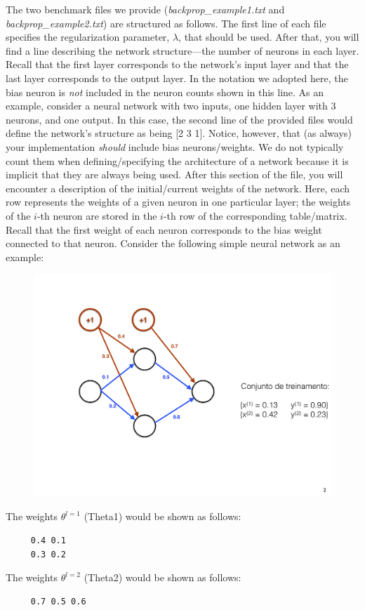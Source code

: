 \documentclass[letterpaper]{article}
\begin{document}
The two benchmark files we provide (\emph{backprop\_example1.txt} and \emph{backprop\_example2.txt}) are structured as follows. The first line of each file specifies the regularization parameter, $\lambda$, that should be used. After that, you will find a line describing the network structure---the number of neurons in each layer. Recall that the first layer corresponds to the network's input layer and that the last layer corresponds to the output layer. In the notation we adopted here, the bias neuron is \textit{not} included in the neuron counts shown in this line. As an example, consider a neural network with two inputs, one hidden layer with 3 neurons, and one output. In this case, the second line of the provided files would define the network's structure as being [2 3 1]. Notice, however, that (as always) your implementation \textit{should} include bias neurons/weights. We do not typically count them when defining/specifying the architecture of a network because it is implicit that they are always being used. After this section of the file, you will encounter a description of the initial/current weights of the network. Here, each row represents the weights of a given neuron in one particular layer; the weights of the $i$-th neuron are stored in the $i$-th row of the corresponding table/matrix. Recall that the first weight of each neuron corresponds to the bias weight connected to that neuron. Consider the following simple neural network as an example:

    \begin{figure}[!h]
        \centering
        \includegraphics[width=0.3\columnwidth]{figures/network_example.pdf}
    \end{figure}

    \noindent The weights $\theta^{l=1}$ (Theta1) would be shown as follows:
    \begin{verbatim}
     0.4 0.1
     0.3 0.2
    \end{verbatim}
    The weights $\theta^{l=2}$ (Theta2) would be shown as follows:  
    \begin{verbatim}
     0.7 0.5 0.6
    \end{verbatim}
\end{document}
